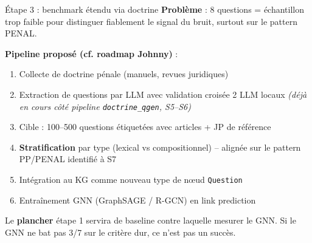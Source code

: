 \documentclass[aspectratio=169,10pt]{beamer}
\newcommand{\keybox}[1]{%
  \begin{center}
  \colorbox{accentsoft}{\parbox{0.92\linewidth}{\centering #1}}
  \end{center}}
\begin{document}
\begin{frame}{Étape 3 : benchmark étendu via doctrine}
  \small
  \textbf{Problème} : 8 questions = échantillon trop faible pour distinguer
  fiablement le signal du bruit, surtout sur le pattern PENAL.

  \vspace{0.4em}
  \textbf{Pipeline proposé (cf. roadmap Johnny)} :
  \begin{enumerate}\setlength\itemsep{0.2em}
    \item Collecte de doctrine pénale (manuels, revues juridiques)
    \item Extraction de questions par LLM avec validation croisée 2 LLM locaux \emph{(déjà en cours côté
    pipeline \texttt{doctrine\_qgen}, S5--S6)}
    \item Cible : 100--500 questions étiquetées avec articles + JP de référence
    \item \textbf{Stratification} par type (lexical vs compositionnel) -- alignée sur le
    pattern PP/PENAL identifié à S7
    \item Intégration au KG comme nouveau type de nœud \texttt{Question}
    \item Entraînement GNN (GraphSAGE / R-GCN) en link prediction
  \end{enumerate}

  \vspace{0.4em}
  \keybox{Le \textbf{plancher} étape 1 servira de baseline contre laquelle mesurer le
  GNN. Si le GNN ne bat pas 3/7 sur le critère dur, ce n'est pas un succès.}
\end{frame}
\end{document}
